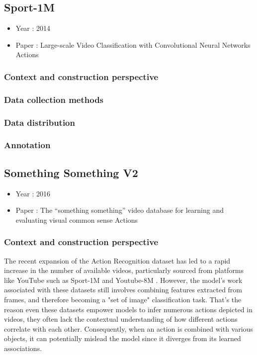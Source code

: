 \documentclass[10pt,onecolumn,letterpaper]{article}
\begin{document}
\subsection{Sport-1M}

\begin{itemize}
	\item Year : 2014
	\item Paper : Large-scale Video Classification with Convolutional Neural Networks
	Actions \cite{Sports1M}
\end{itemize}
\subsubsection{\textbf{Context and construction perspective}}

\subsubsection{Data collection methods}
\subsubsection{Data distribution}
\subsubsection{Annotation}
\subsection{Something Something V2}

\begin{itemize}
	\item Year : 2016
	\item Paper : The “something something” video database for learning and evaluating visual common sense
	Actions \cite{somethingsomething}
\end{itemize}

\subsubsection{\textbf{Context and construction perspective}}

The recent expansion of the Action Recognition dataset has led to a rapid increase in the number of available videos, particularly sourced from platforms like YouTube such as Sport-1M \cite{Sports1M} and Youtube-8M \cite{YouTube8M}. However, the model's work associated with these datasets still involves combining features extracted from frames, and therefore becoming a "set of image" classification task. That's the reason even these datasets empower models to infer numerous actions depicted in videos, they often lack the contextual understanding of how different actions correlate with each other. Consequently, when an action is combined with various objects, it can potentially mislead the model since it diverges from its learned associations. 
\end{document}
